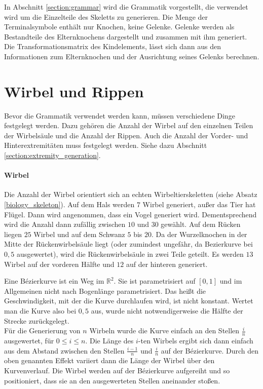 In Abschnitt \ref{section:grammar} wird die Grammatik vorgestellt, die verwendet wird um die Einzelteile des Skeletts zu generieren. Die Menge der Terminalsymbole enthält nur Knochen, keine Gelenke. Gelenke werden als Bestandteile des Elternknochens dargestellt und zusammen mit ihm generiert. Die Transformationsmatrix des Kindelements, lässt sich dann aus den Informationen zum Elternknochen und der Ausrichtung seines Gelenks berechnen.


\section{Wirbel und Rippen}
\label{section:vertebrae_ribs}

Bevor die Grammatik verwendet werden kann, müssen verschiedene Dinge festgelegt werden. Dazu gehören die Anzahl der Wirbel auf den einzelnen Teilen der Wirbelsäule und die Anzahl der Rippen. Auch die Anzahl der Vorder- und Hinterextremitäten muss festgelegt werden. Siehe dazu Abschnitt \ref{section:extremity_generation}.

\paragraph{Wirbel}
Die Anzahl der Wirbel orientiert sich an echten Wirbeltierskeletten (siehe Absatz \ref{biology_skeleton}). Auf dem Hals werden $7$ Wirbel generiert, außer das Tier hat Flügel. Dann wird angenommen, dass ein Vogel generiert wird. Dementsprechend wird die Anzahl dann zufällig zwischen $10$ und $30$ gewählt. Auf dem Rücken liegen $25$ Wirbel und auf dem Schwanz $5$ bis $20$.
Da der Wurzelknochen in der Mitte der Rückenwirbelsäule liegt (oder zumindest ungefähr, da Bezierkurve bei $0{,}5$ ausgewertet), wird die Rückenwirbelsäule in zwei Teile geteilt. Es werden $13$ Wirbel auf der vorderen Hälfte und $12$ auf der hinteren generiert.

Eine Bézierkurve ist ein Weg im $\mathbb{R}^2$. Sie ist parametrisiert auf $[0, 1]$ und im Allgemeinen nicht nach Bogenlänge parametrisiert. Das heißt die Geschwindigkeit, mit der die Kurve durchlaufen wird, ist nicht konstant. Wertet man die Kurve also bei $0,5$ aus, wurde nicht notwendigerweise die Hälfte der Strecke zurückgelegt.\\
Für die Generierung von $n$ Wirbeln wurde die Kurve einfach an den Stellen $\frac{i}{n}$ ausgewertet, für $0 \leq i \leq n$. Die Länge des $i$-ten Wirbels ergibt sich dann einfach aus dem Abstand zwischen den Stellen $\frac{i-1}{n}$ und $\frac{i}{n}$ auf der Bézierkurve. Durch den oben genannten Effekt variiert dann die Länge der Wirbel über den Kurvenverlauf. Die Wirbel werden auf der Bézierkurve aufgereiht und so positioniert, dass sie an den ausgewerteten Stellen aneinander stoßen.

